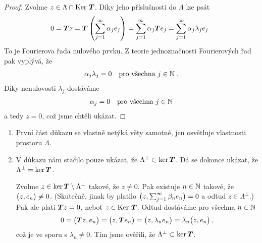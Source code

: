 \begin{proof}
Zvolme $z \in \Lambda \cap \operatorname{Ker}\, \boldsymbol{T}$. Díky jeho příslušnosti do $\Lambda$ lze psát \begin{align*}
    0 = \boldsymbol{T} z = \boldsymbol{T} \left( \sum_{j=1}^\infty \alpha_j e_j \right) =  \sum_{j=1}^\infty \alpha_j \boldsymbol{T} e_j =  \sum_{j=1}^\infty \alpha_j \lambda_j e_j \:.
\end{align*}
To je Fourierova řada nulového prvku. Z teorie jednoznačnosti Fourierových řad pak vyplývá, že \begin{align*}
    \alpha_j \lambda_j =0 \quad \text{pro všechna } j \in \mathbb{N} \:.
\end{align*}
Díky nenulovosti $\lambda_j$ dostáváme \begin{align}
    \alpha_j =0 \quad \text{pro všechna } j \in \mathbb{N}
\end{align}
a tedy $z = 0$, což jsme chtěli ukázat.
\end{proof}

\begin{remark}
\begin{enumerate}
    \item První část důkazu se vlastně netýká věty samotné, jen osvětluje vlastnosti prostoru $\Lambda$.
    \item V důkazu nám stačilo pouze ukázat, že $\Lambda^\bot \subset \ker \boldsymbol{T}$. Dá se dokonce ukázat, že $\Lambda^\bot = \ker \boldsymbol{T}$.
    
    Zvolme $z \in \ker \boldsymbol{T} \setminus \Lambda^\bot $ takové, že $z \neq 0$. Pak existuje $n \in \mathbb{N}$ takové, že $\big( z, e_n \big) \neq 0$. (Skutečně, jinak by platilo $\big( z, \sum_{j=1}^\infty \beta_n e_n \big) =0 $ a odtud $z \in \Lambda^\bot$.) Pak ale platí $\boldsymbol{T} z =0$, neboť $z \in \operatorname{Ker}\, \boldsymbol{T}$. Odtud dostáváme pro všechna $n \in \mathbb{N}$ \begin{align*}
        0 = \big( \boldsymbol{T} z, e_n \big) = \big( z, \boldsymbol{T} e_n \big) = \big( z, \lambda_n e_n \big) = \lambda_n \big( z, e_n \big) \:,
    \end{align*}
    což je ve sporu s $\lambda_n \neq 0$. Tím jsme ověřili, že $\Lambda^\bot \subset \ker \boldsymbol{T}$.
\end{enumerate}
\end{remark}

